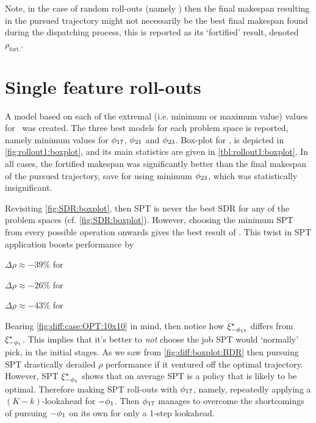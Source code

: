 Note, in the case of random roll-outs (namely \phiRNDRelated) then the final makespan resulting in the pursued trajectory might not necessarily be the best final makespan found during the dispatching process, this is reported as its `fortified' result, denoted $\rho_{\text{fort.}}$. 

\section{Single feature roll-outs}\label{sec:singlerollout}

A model based on each of the extremal (i.e. minimum or maximum value) values 
for \phiGlobalRelated\ was created. The three best models for each problem 
space is reported, namely minimum values for $\phi_{17}$, $\phi_{21}$ and 
$\phi_{23}$. 
Box-plot for \namerho, is depicted in \cref{fig:rollout1:boxplot}, and its 
main statistics are given in \cref{tbl:rollout1:boxplot}.
In all cases, the fortified makespan was significantly better than the final 
makespan of the pursued trajectory, save for  using minimum 
$\phi_{23}$, which was statistically insignificant.

Revisiting \cref{fig:SDR:boxplot}, then SPT is never the best SDR for any of 
the problem spaces (cf. \cref{fig:SDR:boxplot}).
However, choosing the minimum SPT from every possible operation onwards 
gives the best result of \phiSDRRelated. This twist in SPT application boosts 
performance by 
\begin{enumerate*}
    \item $\Delta\rho\approx -39\%$ for 
    \item $\Delta\rho\approx -26\%$ for 
    \item $\Delta\rho\approx -43\%$ for 
\end{enumerate*}
Bearing \cref{fig:diff:case:OPT:10x10} in mind, then notice how 
$\xi^{\star}_{-\phi_{17}}$ differs from $\xi^{\star}_{-\phi_1}$. This implies 
that it's better to \emph{not} choose the job SPT would `normally' pick, in the 
initial stages. As we saw from \cref{fig:diff:boxplot:BDR} then pursuing SPT 
drastically derailed $\rho$ performance if it ventured off the optimal 
trajectory. 
However, SPT $\xi^{\star}_{-\phi_1}$ shows that on average SPT is a policy that 
is likely to be optimal. 
Therefore making SPT roll-outs with $\phi_{17}$, namely, repeatedly applying a 
$(K-k)$-lookahead for $-\phi_1$. 
Then $\phi_{17}$ manages to overcome the shortcomings of pursuing $-\phi_1$ on 
its own for only a 1-step lookahead.

